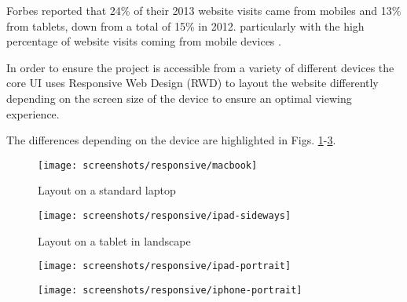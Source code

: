 Forbes reported that 24\% of their 2013 website visits came from mobiles and 13\% from tablets, down from a total of 15\% in 2012. particularly with the high percentage of website visits coming from mobile devices \parencite{steimle2013responsive}.

In order to ensure the project is accessible from a variety of different devices the core UI uses Responsive Web Design (RWD) to layout the website differently depending on the screen size of the device to ensure an optimal viewing experience.

The differences depending on the device are highlighted in Figs. \ref{fig:responsive-macbook}-\ref{fig:responsive-iphone}.

\begin{figure}[h]
    \centering
    \texttt{[image: screenshots/responsive/macbook]}
    \caption{Layout on a standard laptop}
    \label{fig:responsive-macbook}
\end{figure}

\begin{figure}[h]
    \centering
    \texttt{[image: screenshots/responsive/ipad-sideways]}
    \caption{Layout on a tablet in landscape}
    \label{fig:responsive-ipad}
\end{figure}

\begin{figure}
\centering
\begin{minipage}{.5\textwidth}
    \centering
    \texttt{[image: screenshots/responsive/ipad-portrait]}
    \label{fig:responsive-ipad2}
\end{minipage}%
\begin{minipage}{.5\textwidth}
    \centering
    \texttt{[image: screenshots/responsive/iphone-portrait]}
    \label{fig:responsive-iphone}
\end{minipage}
\end{figure}




